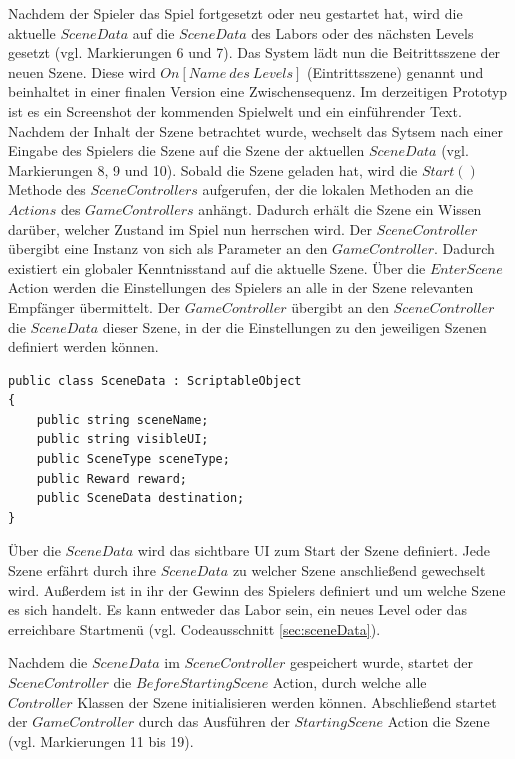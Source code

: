 Nachdem der Spieler das Spiel fortgesetzt oder neu gestartet hat, wird die aktuelle $SceneData$ auf die $SceneData$ des Labors oder des nächsten Levels gesetzt (vgl. Markierungen 6 und 7). Das System lädt nun die Beitrittsszene der neuen Szene. Diese wird $On[Name~ des~ Levels]$ (Eintrittsszene) genannt und beinhaltet in einer finalen Version eine Zwischensequenz. Im derzeitigen Prototyp ist es ein Screenshot der kommenden Spielwelt und ein einführender Text. Nachdem der Inhalt der Szene betrachtet wurde, wechselt das Sytsem nach einer Eingabe des Spielers die Szene auf die Szene der aktuellen $SceneData$ (vgl. Markierungen 8, 9 und 10). Sobald die Szene geladen hat, wird die $Start()$ Methode des $SceneControllers$ aufgerufen, der die lokalen Methoden an die $Actions$ des $GameControllers$ anhängt. Dadurch erhält die Szene ein Wissen darüber, welcher Zustand im Spiel nun herrschen wird. Der $SceneController$ übergibt eine Instanz von sich als Parameter an den $GameController$. Dadurch existiert ein globaler Kenntnisstand auf die aktuelle Szene. Über die $EnterScene$ Action werden die Einstellungen des Spielers an alle in der Szene relevanten Empfänger übermittelt. Der $GameController$ übergibt an den $SceneController$ die $SceneData$ dieser Szene, in der die Einstellungen zu den jeweiligen Szenen definiert werden können.

\begin{lstlisting}[caption={SceneData.ts}, label={sec:sceneData}]
public class SceneData : ScriptableObject
{
    public string sceneName;
    public string visibleUI;
    public SceneType sceneType;
    public Reward reward;
    public SceneData destination;
}
\end{lstlisting}

Über die $SceneData$ wird das sichtbare \ac{UI} zum Start der Szene definiert. Jede Szene erfährt durch ihre $SceneData$ zu welcher Szene anschließend gewechselt wird. Außerdem ist in ihr der Gewinn des Spielers definiert und um welche Szene es sich handelt. Es kann entweder das Labor sein, ein neues Level oder das erreichbare Startmenü (vgl. Codeausschnitt \ref{sec:sceneData}).

Nachdem die $SceneData$ im $SceneController$ gespeichert wurde, startet der\\ $SceneController$ die $BeforeStartingScene$ Action, durch welche alle\\ $Controller$ Klassen der Szene initialisieren werden können. Abschließend startet der $GameController$ durch das Ausführen der $StartingScene$ Action die Szene (vgl. Markierungen 11 bis 19). 

